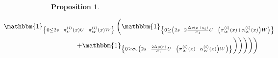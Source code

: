 \documentclass[12pt]{article}
\theoremstyle{Theorem}
\newtheorem{Proposition}[Theorem]{Proposition}
\begin{document}
\begin{Proposition}
\begin{itemize}
{\begin{align*}
& \hspace{-4cm}+ \left.\left. \mathbbm{1}_{\left\{ 0 \leq 2s -   \pi^{\scriptscriptstyle (i)}_{U}(x)U - \pi^{\scriptscriptstyle (i)}_{W}(x)W\right\}} \left(\mathbbm{1}_{\left\{ 0 \geq \left(2s - 2\frac{\Delta\rho(x+e_i)}{\sigma_1}U -  \left(\pi^{\scriptscriptstyle (i)}_{W}(x) + \alpha^{\scriptscriptstyle (i)}_{W}(x)\right)W\right) \right\}}\right.\right.\right.\\
& \left.\left.\left. \left. \left. + \mathbbm{1}_{\left\{ 0 \geq \sigma_{2}\left(2s -\frac{2\Delta\rho(x)}{\sigma_1}U - \left(\pi^{\scriptscriptstyle (i)}_{W}(x) - \alpha^{\scriptscriptstyle (i)}_{W}(x)\right)W\right)\right\}}\right)\right)\right)\right)\right)
\end{align*}
}
\end{itemize}
\end{Proposition}
\end{document}
